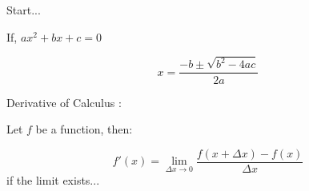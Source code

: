 \documentclass{article}
\begin{document}
    Start...


    If, $ax^2+bx+c = 0$
    
    $$ x = \frac{-b \pm \sqrt{b^2 - 4ac}}{2a} $$

    
    Derivative of Calculus : 

    Let $f$ be a function, then:

    $$f'(x) = \lim_{\Delta x \rightarrow 0} \frac{f(x + \Delta x) - f(x)}{\Delta x}$$
    if the limit exists...
\end{document}
